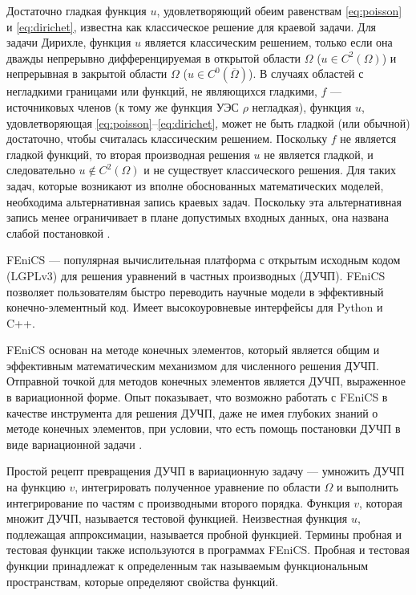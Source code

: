 Достаточно гладкая функция ${u}$, удовлетворяющий обеим равенствам \eqref{eq:poisson} и \eqref{eq:dirichet}, известна как классическое решение для краевой задачи. Для задачи Дирихле, функция ${u}$ является классическим решением, только если она дважды непрерывно дифференцируемая в открытой области ${\Omega}$ (${u \in C^2(\Omega)}$) и непрерывная в закрытой области ${\Omega}$ (${u \in C^0(\overline \Omega)}$). В случаях областей с негладкими границами или функций, не являющихся гладкими, ${f}$ --- источниковых членов (к тому же функция УЭС ${\rho}$ негладкая), функция ${u}$, удовлетворяющая \eqref{eq:poisson}--\eqref{eq:dirichet}, может не быть гладкой (или обычной) достаточно, чтобы считалась классическим решением. Поскольку ${f}$ не является гладкой функций, то вторая производная решения ${u}$ не является гладкой, и следовательно ${{u \notin C^2(\Omega)}}$ и не существует классического решения. Для таких задач, которые возникают из вполне обоснованных математических моделей, необходима альтернативная запись краевых задач. Поскольку эта альтернативная запись менее ограничивает в плане допустимых входных данных, она названа слабой постановкой \cite[с. 14]{FEFIS}.

FEniCS --- популярная вычислительная платформа с открытым исходным кодом (LGPLv3) для решения уравнений в частных производных (ДУЧП). FEniCS позволяет пользователям быстро переводить научные модели в эффективный конечно-элементный код. Имеет высокоуровневые интерфейсы для Python и C++.

FEniCS основан на методе конечных элементов, который является общим и эффективным математическим механизмом для численного решения ДУЧП. Отправной точкой для методов конечных элементов является ДУЧП, выраженное в вариационной форме. Опыт показывает, что возможно работать с FEniCS в качестве инструмента для решения ДУЧП, даже не имея глубоких знаний о методе конечных элементов, при условии, что есть помощь постановки ДУЧП в виде вариационной задачи \cite{FEniCS}.

Простой рецепт превращения ДУЧП в вариационную задачу --- умножить ДУЧП на функцию ${v}$, интегрировать полученное уравнение по области ${\Omega}$ и выполнить интегрирование по частям с производными второго порядка. Функция ${v}$, которая множит ДУЧП, называется тестовой функцией. Неизвестная функция ${u}$, подлежащая аппроксимации, называется пробной функцией. Термины пробная и тестовая функции также используются в программах FEniCS. Пробная и тестовая функции принадлежат к определенным так называемым функциональным пространствам, которые определяют свойства функций.

